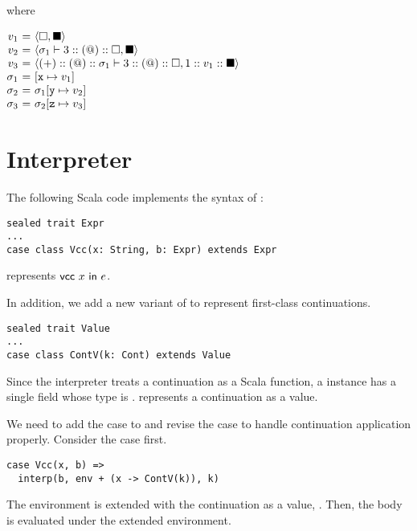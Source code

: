 where

$
\begin{array}{@{}r@{~}c@{~}l}
  v_1&=&\langle\square,\blacksquare\rangle\\
  v_2&=&\langle\sigma_1\vdash3::(@)::\square,\blacksquare\rangle\\
  v_3&=&\langle(+)::(@)::\sigma_1\vdash3::(@)::\square,1::v_1::\blacksquare\rangle\\
  \sigma_1&=&[\cx\mapsto v_1]\\
  \sigma_2&=&\sigma_1[\cy\mapsto v_2]\\
  \sigma_3&=&\sigma_2[\cz\mapsto v_3]\\
\end{array}
$

\section{Interpreter}

The following Scala code implements the syntax of \lang:

\begin{verbatim}
sealed trait Expr
...
case class Vcc(x: String, b: Expr) extends Expr
\end{verbatim}

 represents $\textsf{vcc}\ x\ \textsf{in}\ e$.

In addition, we add a new variant of  to represent first-class
continuations.

\begin{verbatim}
sealed trait Value
...
case class ContV(k: Cont) extends Value
\end{verbatim}

Since the interpreter treats a continuation as a Scala function,
a  instance has a single field whose type is .
 represents a continuation  as a value.

We need to add the  case to  and revise the 
case to handle continuation application properly.
Consider the  case first.

\begin{verbatim}
case Vcc(x, b) =>
  interp(b, env + (x -> ContV(k)), k)
\end{verbatim}

The environment is extended with the continuation as a value,
. Then, the body is evaluated under the extended environment.

